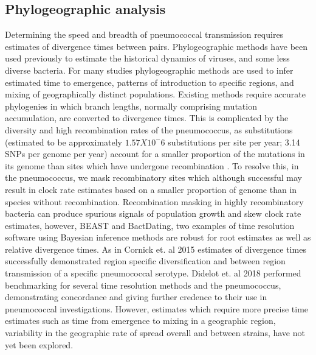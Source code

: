 \documentclass{article}
\begin{document}
\subsection{Phylogeographic analysis} 
Determining the speed and breadth of pneumococcal transmission requires estimates of divergence times between pairs. Phylogeographic methods have been used previously to estimate the historical dynamics of viruses, and some less diverse bacteria. For many studies phylogeographic methods are used to infer estimated time to emergence, patterns of introduction to specific regions, and mixing of geographically distinct populations\cite{wangGenomicEpidemiologyVibrio2020a,weillGenomicHistorySeventh2017,chihotaGeospatialDistributionMycobacterium2018,bartGlobalPopulationStructure2014,comasOutofAfricaMigrationNeolithic2013,allicockPhylogeographyPopulationDynamics2012,okoroIntracontinentalSpreadHuman2012,mutrejaEvidenceSeveralWaves2011,lemeyBayesianPhylogeographyFinds2009a}. Existing methods require accurate phylogenies in which branch lengths, normally comprising mutation accumulation, are converted to divergence times. This is complicated by the diversity and high recombination rates of the pneumococcus, as substitutions (estimated to be approximately $1.57X10^-6$ substitutions per site per year; 3.14 SNPs per genome per year) account for a smaller proportion of the mutations in its genome than sites which have undergone recombination \cite{croucherRapidPneumococcalEvolution2011}. To resolve this, in the pneumococcus, we mask recombinatory sites which although successful may result in clock rate estimates based on a smaller proportion of genome than in species without recombination. Recombination masking in highly recombinatory bacteria can produce spurious signals of population growth and skew clock rate estimates, however, BEAST and BactDating, two examples of time resolution software using Bayesian inference methods are robust for root estimates as well as relative divergence times\cite{cornickRegionspecificDiversificationHighly2015,gladstoneInternationalGenomicDefinition2019b,croucherRapidPhylogeneticAnalysis2015,didelotBayesianInferenceAncestral2018,drummondBayesianEvolutionaryAnalysis2015,lapierreImpactSelectionGene2016}. As in Cornick et. al 2015 estimates of divergence times successfully demonstrated region specific diversification and between region transmission of a specific pneumococcal serotype\cite{cornickRegionspecificDiversificationHighly2015}.
Didelot et. al 2018 performed benchmarking for several time resolution methods and the pneumococcus, demonstrating concordance and giving further credence to their use in pneumococcal investigations\cite{didelotBayesianInferenceAncestral2018}. However, estimates which require more precise time estimates such as time from emergence to mixing in a geographic region, variability in the geographic rate of spread overall and between strains, have not yet been explored.  
\end{document}
